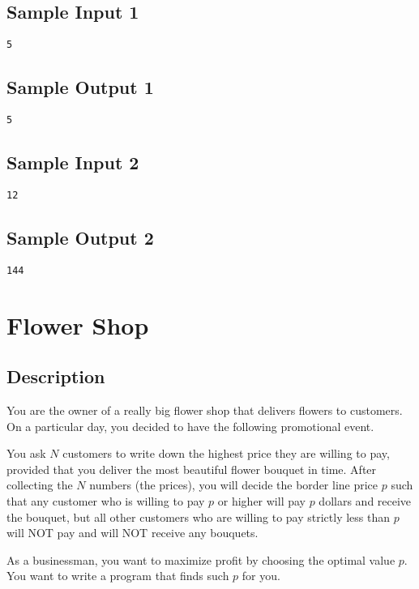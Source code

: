\subsection*{Sample Input 1}
\begin{verbatim}
5
\end{verbatim}
\subsection*{Sample Output 1}
\begin{verbatim}
5
\end{verbatim}

\subsection*{Sample Input 2}
\begin{verbatim}
12
\end{verbatim}
\subsection*{Sample Output 2}
\begin{verbatim}
144
\end{verbatim}






\newpage

\section{Flower Shop}
\subsection*{Description}
You are the owner of a really big flower shop that delivers flowers to customers.  On a particular day, you decided to have the following promotional event.  

You ask $N$ customers to write down the highest price they are willing to pay, provided that you deliver the most beautiful flower bouquet in time.  After collecting the $N$ numbers (the prices), you will decide the border line price $p$ such that any customer who is willing to pay $p$ or higher will pay $p$ dollars and receive the bouquet, but all other customers who are willing to pay strictly less than $p$ will NOT pay and will NOT receive any bouquets. 

As a businessman, you want to maximize profit by choosing the optimal value $p$.  You want to write a program that finds such $p$ for you. 

